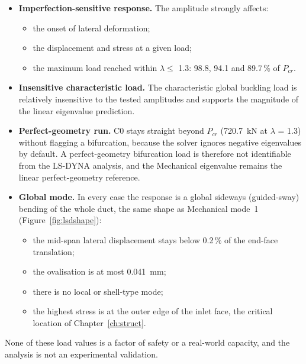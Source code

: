 \begin{itemize}
\item \textbf{Imperfection-sensitive response.} The amplitude strongly affects:
      \begin{itemize}
      \item the onset of lateral deformation;
      \item the displacement and stress at a given load;
      \item the maximum load reached within $\lambda \le$ 1.3: 98.8, 94.1 and 89.7\,\% of $P_{cr}$.
      \end{itemize}
\item \textbf{Insensitive characteristic load.} The characteristic global buckling load is relatively insensitive to the tested amplitudes
      and supports the magnitude of the linear eigenvalue prediction.
\item \textbf{Perfect-geometry run.} C0 stays straight beyond $P_{cr}$ (720.7~kN at $\lambda$ = 1.3) without flagging a bifurcation, because
      the solver ignores negative eigenvalues by default. A perfect-geometry bifurcation load is therefore not identifiable from the LS-DYNA
      analysis, and the Mechanical eigenvalue remains the linear perfect-geometry reference.
\item \textbf{Global mode.} In every case the response is a global sideways (guided-sway) bending of the whole duct, the same shape as
      Mechanical mode~1 (Figure~\ref{fig:lsdshape}):
      \begin{itemize}
      \item the mid-span lateral displacement stays below 0.2\,\% of the end-face translation;
      \item the ovalisation is at most 0.041~mm;
      \item there is no local or shell-type mode;
      \item the highest stress is at the outer edge of the inlet face, the critical location of Chapter~\ref{ch:struct}.
      \end{itemize}
\end{itemize}
None of these load values is a factor of safety or a real-world capacity, and the analysis is not an experimental validation.

